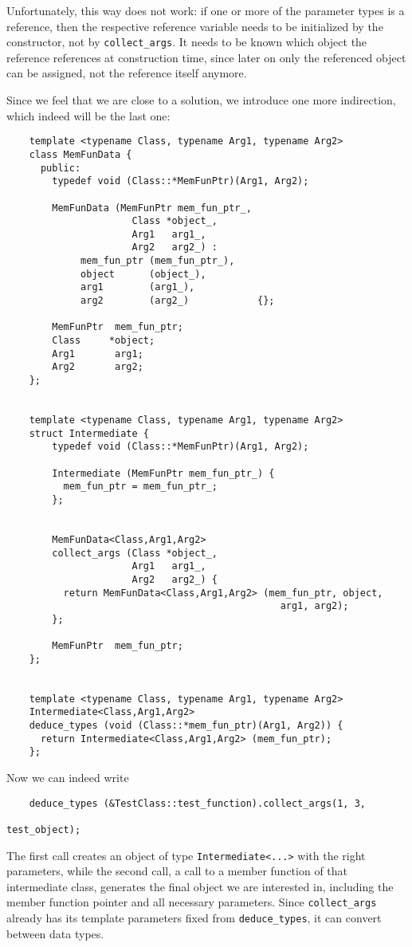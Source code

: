\documentclass[11pt]{article}
\begin{document}
Unfortunately, this way does not work: if one or more of the parameter types
is a reference, then the respective reference variable needs to be initialized
by the constructor, not by \texttt{collect\_args}. It needs to be known which
object the reference references at construction time, since later on only the
referenced object can be assigned, not the reference itself anymore.

Since we feel that we are close to a solution, we introduce one more
indirection, which indeed will be the last one:
\begin{verbatim}
    template <typename Class, typename Arg1, typename Arg2>
    class MemFunData { 
      public:
        typedef void (Class::*MemFunPtr)(Arg1, Arg2);

        MemFunData (MemFunPtr mem_fun_ptr_,
                      Class *object_,
                      Arg1   arg1_,
                      Arg2   arg2_) :
             mem_fun_ptr (mem_fun_ptr_),
             object      (object_),
             arg1        (arg1_),
             arg2        (arg2_)            {};

        MemFunPtr  mem_fun_ptr;
        Class     *object;
        Arg1       arg1;
        Arg2       arg2;
    };


    template <typename Class, typename Arg1, typename Arg2>
    struct Intermediate { 
        typedef void (Class::*MemFunPtr)(Arg1, Arg2);

        Intermediate (MemFunPtr mem_fun_ptr_) {
          mem_fun_ptr = mem_fun_ptr_;
        };

        
        MemFunData<Class,Arg1,Arg2>
        collect_args (Class *object_,
                      Arg1   arg1_,
                      Arg2   arg2_) {
          return MemFunData<Class,Arg1,Arg2> (mem_fun_ptr, object,
                                                arg1, arg2);
        };

        MemFunPtr  mem_fun_ptr;
    };


    template <typename Class, typename Arg1, typename Arg2>
    Intermediate<Class,Arg1,Arg2>
    deduce_types (void (Class::*mem_fun_ptr)(Arg1, Arg2)) {
      return Intermediate<Class,Arg1,Arg2> (mem_fun_ptr);
    };
\end{verbatim}

Now we can indeed write
\begin{verbatim}
    deduce_types (&TestClass::test_function).collect_args(1, 3,
                                                          test_object);
\end{verbatim}
The first call creates an object of type \texttt{Intermediate<...>} with the
right parameters, while the second call, a call to a member function of that
intermediate class, generates the final object we are interested in, including
the member function pointer and all necessary parameters. Since
\texttt{collect\_args} already has its template parameters fixed from
\texttt{deduce\_types}, it can convert between data types.
\end{document}
